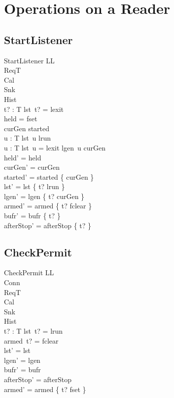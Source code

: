 \documentclass[a4paper,10pt,fleqn]{article}
\begin{document}
\section{Operations on a Reader}

\subsection{StartListener}

\begin{schema}{StartListener}
  \Delta LL \\
  \Xi ReqT \\
  \Xi Cal \\
  \Xi Snk \\
  \Xi Hist \\
  t? : T
\where
  lst~t? = lexit \\
  held = fset \\
  curGen \notin started \\
  \forall u : T \spot lst~u \neq lrun \\
  \forall u : T \spot lst~u = lexit \lor lgen~u \neq curGen \\
  held' = held \\
  curGen' = curGen \\
  started' = started \cup \{ curGen \} \\
  lst' = lst \oplus \{ t? \mapsto lrun \} \\
  lgen' = lgen \oplus \{ t? \mapsto curGen \} \\
  armed' = armed \oplus \{ t? \mapsto fclear \} \\
  bufr' = bufr \oplus \{ t? \mapsto \emptyset \} \\
  afterStop' = afterStop \oplus \{ t?  \}
\end{schema}

\subsection{CheckPermit}

\begin{schema}{CheckPermit}
  \Delta LL \\
  \Xi Conn \\
  \Xi ReqT \\
  \Xi Cal \\
  \Xi Snk \\
  \Xi Hist \\
  t? : T
\where
  lst~t? = lrun \\
  armed~t? = fclear \\
  lst' = lst \\
  lgen' = lgen \\
  bufr' = bufr \\
  afterStop' = afterStop \\
  armed' = armed \oplus \{ t? \mapsto fset \}
\end{schema}
\end{document}
